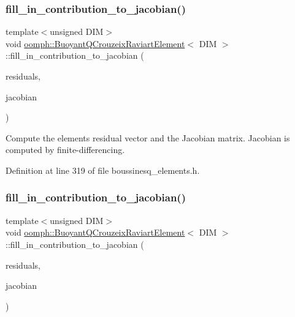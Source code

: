 \subsubsection{\texorpdfstring{fill\+\_\+in\+\_\+contribution\+\_\+to\+\_\+jacobian()}{fill\_in\_contribution\_to\_jacobian()}\hspace{0.1cm}{\footnotesize\ttfamily [1/3]}}
{\footnotesize\ttfamily template$<$unsigned D\+IM$>$ \\
void \hyperlink{classoomph_1_1BuoyantQCrouzeixRaviartElement}{oomph\+::\+Buoyant\+Q\+Crouzeix\+Raviart\+Element}$<$ D\+IM $>$\+::fill\+\_\+in\+\_\+contribution\+\_\+to\+\_\+jacobian (\begin{DoxyParamCaption}\item[{Vector$<$ double $>$ \&}]{residuals,  }\item[{Dense\+Matrix$<$ double $>$ \&}]{jacobian }\end{DoxyParamCaption})\hspace{0.3cm}{\ttfamily [inline]}}



Compute the element\textquotesingle{}s residual vector and the Jacobian matrix. Jacobian is computed by finite-\/differencing. 



Definition at line 319 of file boussinesq\+\_\+elements.\+h.

\mbox{\label{classoomph_1_1BuoyantQCrouzeixRaviartElement_a7bd9313dd697c1219cee4a65692388b5}} 
\subsubsection{\texorpdfstring{fill\+\_\+in\+\_\+contribution\+\_\+to\+\_\+jacobian()}{fill\_in\_contribution\_to\_jacobian()}\hspace{0.1cm}{\footnotesize\ttfamily [2/3]}}
{\footnotesize\ttfamily template$<$unsigned D\+IM$>$ \\
void \hyperlink{classoomph_1_1BuoyantQCrouzeixRaviartElement}{oomph\+::\+Buoyant\+Q\+Crouzeix\+Raviart\+Element}$<$ D\+IM $>$\+::fill\+\_\+in\+\_\+contribution\+\_\+to\+\_\+jacobian (\begin{DoxyParamCaption}\item[{Vector$<$ double $>$ \&}]{residuals,  }\item[{Dense\+Matrix$<$ double $>$ \&}]{jacobian }\end{DoxyParamCaption})\hspace{0.3cm}{\ttfamily [inline]}}



